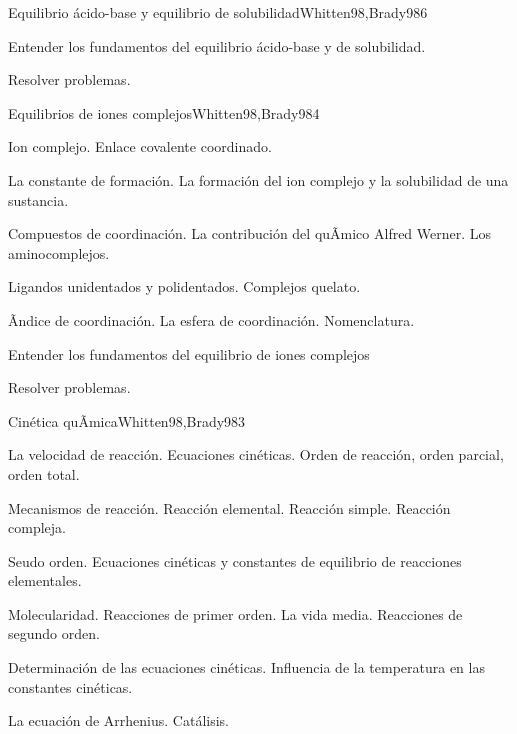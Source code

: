 \begin{syllabus}
\begin{unit}{Equilibrio ácido-base y equilibrio de solubilidad}{Whitten98,Brady98}{6}
\begin{unitgoals}
	\item Entender los fundamentos del equilibrio ácido-base y de solubilidad.
	\item Resolver problemas.
\end{unitgoals}
\end{unit}

\begin{unit}{Equilibrios de iones complejos}{Whitten98,Brady98}{4}
\begin{topics}
	\item Ion complejo. Enlace covalente coordinado.
	\item La constante de formación. La formación del ion complejo y la solubilidad de una sustancia.
	\item Compuestos de coordinación. La contribución del quÃ­mico Alfred Werner. Los aminocomplejos.
	\item Ligandos unidentados y polidentados. Complejos quelato.
	\item Ãndice de coordinación. La esfera de coordinación. Nomenclatura.
   \end{topics}

   \begin{unitgoals}
      \item Entender los fundamentos del equilibrio de iones complejos
      \item Resolver problemas.
   \end{unitgoals}
\end{unit}

\begin{unit}{Cinética quÃ­mica}{Whitten98,Brady98}{3}
\begin{topics}
      \item La velocidad de  reacción. Ecuaciones cinéticas. Orden de reacción, orden parcial, orden total.
      \item Mecanismos de reacción. Reacción elemental. Reacción simple. Reacción compleja.
	\item Seudo orden. Ecuaciones cinéticas y constantes de equilibrio de reacciones elementales.
	\item Molecularidad. Reacciones de primer orden. La vida media. Reacciones de segundo orden.
	\item Determinación de las ecuaciones cinéticas. Influencia de la temperatura en las constantes cinéticas.
	\item La ecuación de Arrhenius. Catálisis.
  \end{topics}


\end{unit}
\end{syllabus}
